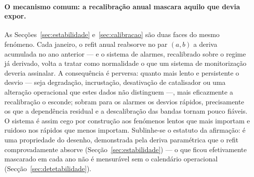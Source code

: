 \paragraph{O mecanismo comum: a recalibração anual mascara aquilo que devia
expor.} As Secções~\ref{sec:estabilidade} e~\ref{sec:calibracao} são
duas faces do mesmo fenómeno. Cada janeiro, o refit anual reabsorve no par
$(a,b)$ a deriva acumulada no ano anterior --- e o sistema de alarmes,
recalibrado sobre o regime já derivado, volta a tratar como normalidade o
que um sistema de monitorização deveria assinalar. A consequência é
perversa: quanto mais lento e persistente o desvio --- seja degradação,
incrustação, desativação de catalisador ou uma alteração operacional que
estes dados não distinguem ---, mais eficazmente a recalibração o esconde; sobram para os
alarmes os desvios rápidos, precisamente os que a dependência residual e a
descalibração das bandas tornam pouco fiáveis. O sistema é assim cego por
construção aos fenómenos lentos que mais importam e ruidoso nos rápidos que
menos importam. Sublinhe-se o estatuto da afirmação: é uma propriedade do
desenho, demonstrada pela deriva paramétrica que o refit comprovadamente
absorve (Secção~\ref{sec:estabilidade}) --- o que ficou efetivamente
mascarado em cada ano não é mensurável sem o calendário operacional
(Secção~\ref{sec:detetabilidade}).

